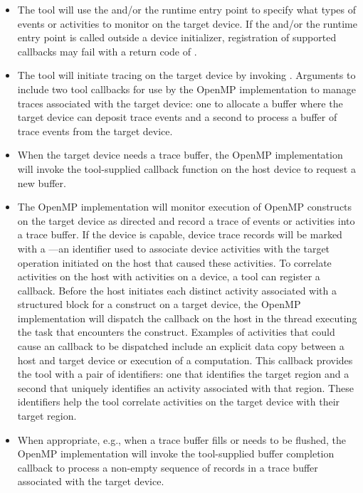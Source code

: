 \begin{itemize}
\item The tool will use the 
  and/or the  runtime entry point to specify what
  types of events or activities to monitor on the target device.
  If the  and/or the
   runtime entry point is called outside a device
  initializer, registration of supported callbacks may fail with a return code of
  .
\item The tool will initiate tracing on the target device by
  invoking . Arguments to 
  include two tool callbacks for use by the OpenMP implementation to manage
  traces associated with the target device: one to allocate
  a buffer where the target device can deposit trace events and a
  second to process a buffer of trace events from the target device.
\item When the target device needs a trace buffer, the OpenMP implementation
  will invoke the tool-supplied callback function on the host device to request a new buffer.
\item The OpenMP implementation will monitor execution of OpenMP constructs on the target device as
  directed and record a trace of events or activities into a trace
  buffer. If the device is capable, device trace records will be
  marked with a ---an identifier used to associate
  device activities with the target operation initiated on the host
  that caused these activities.  To correlate activities on the host
  with activities on a device, a tool can register a
   callback.
  Before the host initiates each distinct activity associated with a structured block for a  construct
  on a target device, the OpenMP implementation will dispatch the  callback
  on the host in the thread executing the task that encounters the  construct.
  Examples of activities that could cause an  callback to be dispatched
  include an explicit data copy between a host and target device or execution of a computation.
  This callback provides the tool with a pair of identifiers: one that identifies the target region and a second
  that uniquely identifies an activity associated with that region.
  These identifiers help the tool correlate activities on the target device with their target region.
\item When appropriate, e.g., when a trace buffer fills or needs to be
  flushed, the OpenMP implementation will invoke the tool-supplied buffer
  completion callback to process a non-empty sequence of
  records in a trace buffer associated with the target device.


\end{itemize}
